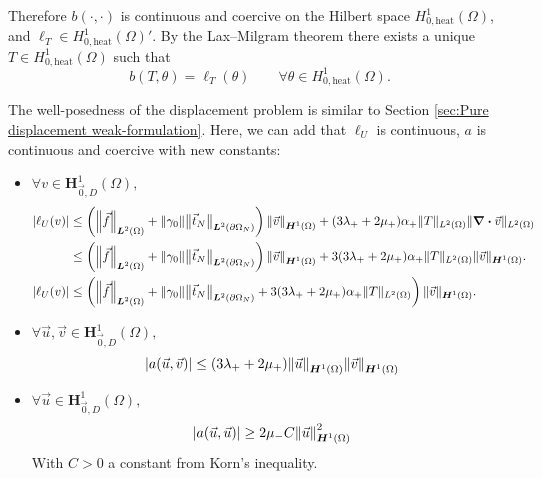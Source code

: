 \documentclass[a4paper,12pt,twoside]{report}
\begin{document}
Therefore $b(\cdot,\cdot)$ is continuous and coercive on the Hilbert space $H^1_{0,\text{heat}}(\Omega)$, and $\ell_T\in H^1_{0,\text{heat}}(\Omega)'$. By the Lax--Milgram theorem there exists a unique $T\in H^1_{0,\text{heat}}(\Omega)$ such that
\[
b(T,\theta)=\ell_T(\theta)\qquad\forall\theta\in H^1_{0,\text{heat}}(\Omega).
\]

The well-posedness of the displacement problem is similar to Section \ref{sec:Pure displacement weak-formulation}. Here, we can add that $\ell_U$ is continuous, $a$ is continuous and coercive with new constants:
\begin{itemize}
	\item $\forall v \in \boldsymbol{H}^1_{\vec 0,D}(\Omega),$
	\begin{equation*}
	\begin{aligned}
	|\ell_U(v)| & \leq \left( \norm{\vec f}_{\boldsymbol L^2(\Omega)} + \norm{\gamma_0} \norm{\vec t_N}_{\boldsymbol L^2(\partial \Omega_N)}\right)\norm{\vec v}_{\boldsymbol H^1(\Omega)} + (3 \lambda_+ + 2 \mu_+) \alpha_+ \|T\|_{L^2(\Omega)} \|\div \vec v\|_{L^2(\Omega)} \\
	& \leq \left( \norm{\vec f}_{\boldsymbol L^2(\Omega)} + \norm{\gamma_0} \norm{\vec t_N}_{\boldsymbol L^2(\partial \Omega_N)}\right)\norm{\vec v}_{\boldsymbol H^1(\Omega)} + 3(3 \lambda_+ + 2 \mu_+) \alpha_+ \|T\|_{L^2(\Omega)} \|\vec v\|_{\boldsymbol H^1(\Omega)}. \\
	|\ell_U(v)| & \leq \left( \norm{\vec f}_{\boldsymbol L^2(\Omega)} + \norm{\gamma_0} \norm{\vec t_N}_{\boldsymbol L^2(\partial \Omega_N)} + 3(3 \lambda_+ + 2 \mu_+) \alpha_+ \|T\|_{L^2(\Omega)} \right) \|\vec v\|_{\boldsymbol H^1(\Omega)}.
	\end{aligned}
	\end{equation*}
	\item $\forall \vec u, \vec v \in \boldsymbol{H}^1_{\vec 0,D}(\Omega),$
	\begin{equation*}
		\left| a(\vec u, \vec v) \right| \leq (3\lambda_+ + 2\mu_+)\norm{\vec u}_{\boldsymbol H^1(\Omega)}\norm{\vec v}_{\boldsymbol H^1(\Omega)}
	\end{equation*}
	\item $\forall \vec u \in \boldsymbol{H}^1_{\vec 0,D}(\Omega),$
	\begin{equation*}
		\left| a(\vec u, \vec u) \right| \geq 2 \mu_- C \norm{\vec u}_{\boldsymbol{H}^1(\Omega)}^2
	\end{equation*}
	With $C > 0$ a constant from Korn's inequality.
\end{itemize}
\end{document}
